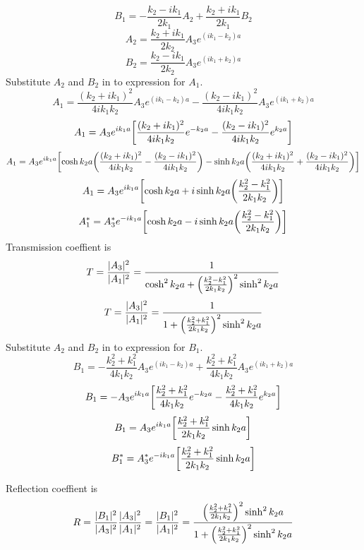 \documentclass[12pt]{article}
\begin{document}
\[B_1=-\frac{k_2-ik_1}{2k_1}A_2+\frac{k_2+ik_1}{2k_1}B_2\]
\[A_2=\frac{k_2+ik_1}{2k_2}A_3e^{(ik_1-k_2)a}\]
\[B_2=\frac{k_2-ik_1}{2k_2}A_3e^{(ik_1+k_2)a}\]
Substitute $A_2$ and $B_2$ in to expression for $A_1$.\\
\[A_1=\frac{(k_2+ik_1)^2}{4ik_1k_2}A_3e^{(ik_1-k_2)a}-\frac{(k_2-ik_1)^2}{4ik_1k_2}A_3e^{(ik_1+k_2)a}\]
\[A_1=A_3e^{ik_1a}\qty[\frac{(k_2+ik_1)^2}{4ik_1k_2}e^{-k_2a}-\frac{(k_2-ik_1)^2}{4ik_1k_2}e^{k_2a}]\]
\[A_1=A_3e^{ik_1a}\qty[\cosh k_2a\qty(\frac{(k_2+ik_1)^2}{4ik_1k_2}-\frac{(k_2-ik_1)^2}{4ik_1k_2})-\sinh k_2a\qty(\frac{(k_2+ik_1)^2}{4ik_1k_2}+\frac{(k_2-ik_1)^2}{4ik_1k_2})]\]
\[A_1=A_3e^{ik_1a}\qty[\cosh k_2a+i\sinh k_2a\qty(\frac{k_2^2-k_1^2}{2k_1k_2})]\]
\[A_1^*=A_3^*e^{-ik_1a}\qty[\cosh k_2a-i\sinh k_2a\qty(\frac{k_2^2-k_1^2}{2k_1k_2})]\]
\newpage
Transmission coeffient is
\[T=\frac{|A_3|^2}{|A_1|^2}=\frac{1}{\cosh^2 k_2a+\qty(\frac{k^2_2-k^2_1}{2k_1k_2})^2\sinh^2 k_2a}\]
\[T=\frac{|A_3|^2}{|A_1|^2}=\frac{1}{1+\qty(\frac{k^2_2+k^2_1}{2k_1k_2})^2\sinh^2 k_2a}\]
Substitute $A_2$ and $B_2$ in to expression for $B_1$.\\
\[B_1=-\frac{k_2^2+k_1^2}{4k_1k_2}A_3e^{(ik_1-k_2)a}+\frac{k_2^2+k_1^2}{4k_1k_2}A_3e^{(ik_1+k_2)a}\]
\[B_1=-A_3e^{ik_1a}\qty[\frac{k_2^2+k_1^2}{4k_1k_2}e^{-k_2a}-\frac{k_2^2+k_1^2}{4k_1k_2}e^{k_2a}]\]
\[B_1=A_3e^{ik_1a}\qty[\frac{k_2^2+k_1^2}{2k_1k_2}\sinh k_2a]\]
\[B_1^*=A_3^*e^{-ik_1a}\qty[\frac{k_2^2+k_1^2}{2k_1k_2}\sinh k_2a]\]

Reflection coeffient is
\[R=\frac{|B_1|^2}{|A_3|^2}\frac{|A_3|^2}{|A_1|^2}=\frac{|B_1|^2}{|A_1|^2}=\frac{\qty(\frac{k^2_2+k^2_1}{2k_1k_2})^2\sinh^2 k_2a}{1+\qty(\frac{k^2_2+k^2_1}{2k_1k_2})^2\sinh^2 k_2a}\]
\end{document}
